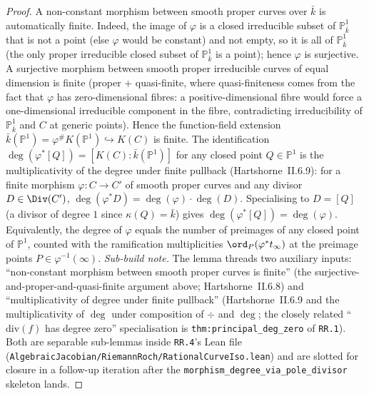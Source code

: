 \begin{proof}
  \leanok
  A non-constant morphism between smooth proper curves over \(\bar k\) is
  automatically finite. Indeed, the image of \(\varphi\) is a closed
  irreducible subset of \(\mathbb P^1_{\bar k}\) that is not a point (else
  \(\varphi\) would be constant) and not empty, so it is all of $\mathbb
  P^1_{\bar k}$ (the only proper irreducible closed subset of $\mathbb
  P^1_{\bar k}$ is a point); hence $\varphi$ is surjective. A surjective
  morphism between smooth proper irreducible curves of equal dimension is
  finite (proper + quasi-finite, where quasi-finiteness comes from the
  fact that \(\varphi\) has zero-dimensional fibres: a positive-dimensional
  fibre would force a one-dimensional irreducible component in the fibre,
  contradicting irreducibility of \(\mathbb P^1_{\bar k}\) and \(C\) at
  generic points). Hence the function-field extension
  \(\bar k(\mathbb P^1) = \varphi^\# K(\mathbb P^1) \hookrightarrow K(C)\)
  is finite.
  The identification \(\deg(\varphi^*[Q]) = [K(C) : \bar k(\mathbb P^1)]\) for
  any closed point \(Q \in \mathbb P^1\) is the multiplicativity of the
  degree under finite pullback (Hartshorne~II.6.9): for a finite morphism
  \(\varphi \colon C \to C'\) of smooth proper curves and any divisor $D \in
  \Div(C')$, $\deg(\varphi^* D) = \deg(\varphi) \cdot \deg(D)$. Specialising
  to \(D = [Q]\) (a divisor of degree \(1\) since \(\kappa(Q) = \bar k\)) gives
  \(\deg(\varphi^*[Q]) = \deg(\varphi)\). Equivalently, the degree of
  \(\varphi\) equals the number of preimages of any closed point of $\mathbb
  P^1$, counted with the ramification multiplicities $\ord_P(\varphi^*
  t_\infty)$ at the preimage points $P \in \varphi^{-1}(\infty)$.
  \emph{Sub-build note.} The lemma threads two auxiliary inputs:
  ``non-constant morphism between smooth proper curves is finite'' (the
  surjective-and-proper-and-quasi-finite argument above; Hartshorne~II.6.8)
  and ``multiplicativity of degree under finite pullback'' (Hartshorne~II.6.9
  and the multiplicativity of \(\deg\) under composition of \(\div\) and
  \(\deg\); the closely related ``\(\mathrm{div}(f)\) has degree zero'' specialisation
  is \texttt{thm:principal_deg_zero} of \texttt{RR.1}). Both are separable
  sub-lemmas inside \texttt{RR.4}'s Lean file
  (\texttt{AlgebraicJacobian/RiemannRoch/RationalCurveIso.lean}) and are
  slotted for closure in a follow-up iteration after the
  \texttt{morphism\_degree\_via\_pole\_divisor} skeleton lands.
\end{proof}
